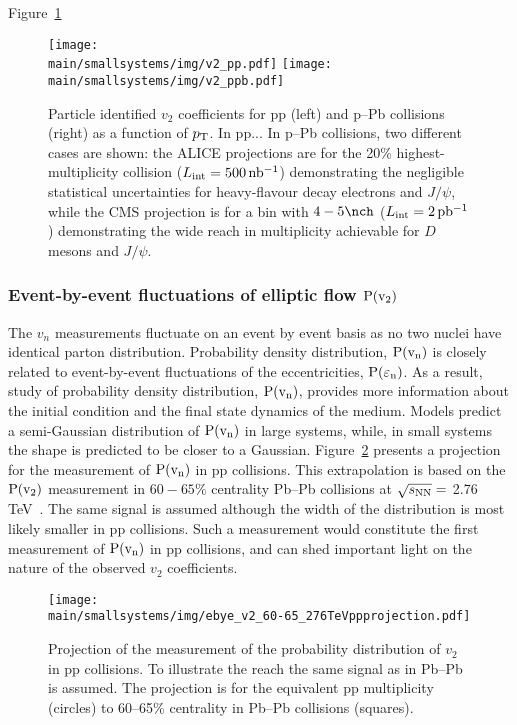 \documentclass[../report.tex]{subfiles}
\providecommand{\main}{..}
\begin{document}
Figure~\ref{fig:smallsystems_corr_cumulants_pid}

\begin{figure}[ht]
\centering
\texttt{[image: \\main/smallsystems/img/v2\_pp.pdf]}
\hfill
\texttt{[image: \\main/smallsystems/img/v2\_ppb.pdf]}

\caption{Particle identified $v_2$ coefficients for pp (left) and p--Pb collisions (right) as a function of $p\sb{\scriptstyle\mathrm{T}}$. In pp... In p--Pb collisions, two different cases are shown: the ALICE projections are for the 20\% highest-multiplicity collision ($L_{\rm int} = \unit[500]{nb^{-1}}$) demonstrating the negligible statistical uncertainties for heavy-flavour decay electrons and $J/\psi$, while the CMS projection is for a bin with $4-5 \nch$ ($L_{\rm int} = \unit[2]{pb^{-1}}$) demonstrating the wide reach in multiplicity achievable for $D$ mesons and $J/\psi$.
}
\label{fig:smallsystems_corr_cumulants_pid}
\end{figure}

\subsubsection{Event-by-event fluctuations of elliptic flow $\rm{P}(v_{2})$}

The $v_n$ measurements fluctuate on an event by event basis as no two nuclei have identical parton distribution. Probability density distribution, $\rm{P}(v_n)$ is closely related to event-by-event fluctuations of the eccentricities, $\rm{P}(\varepsilon_{n})$. As a result,  
study of probability density distribution, $\rm{P}(v_n)$,  provides more information about the initial condition and the final state dynamics of the medium. Models predict a semi-Gaussian distribution of $\rm{P}(v_{n})$ in large systems, while, in small systems the shape is predicted to be closer to a Gaussian. Figure~\ref{fig:smallsystems_corr_pvn} presents a projection for the measurement of $\rm{P}(v_n)$ in pp collisions. This extrapolation is based on the $\rm{P}(v_{2})$ measurement in $60-65\%$ centrality Pb--Pb collisions at $\sqrt{s_{\rm{NN}}} = $ 2.76 TeV~\cite{Aad:2013xma}. The same signal is assumed although the width of the distribution is most likely smaller in pp collisions. Such a measurement would constitute the first measurement of $\rm{P}(v_{n})$ in pp collisions, and can shed important light on the nature of the observed $v_2$ coefficients.

\begin{figure}[ht]
\centering
\texttt{[image: \\main/smallsystems/img/ebye\_v2\_60-65\_276TeVppprojection.pdf]}

\caption{Projection of the measurement of the probability distribution of $v_2$ in pp collisions. To illustrate the reach the same signal as in Pb--Pb~\cite{Aad:2013xma} is assumed. The projection is for the equivalent pp multiplicity (circles) to 60--65\% centrality in Pb--Pb collisions (squares).}
\label{fig:smallsystems_corr_pvn}
\end{figure}
\end{document}

